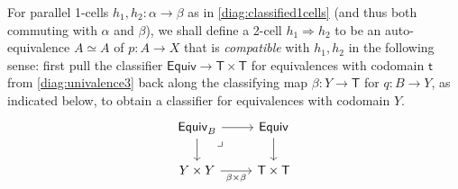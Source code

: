 \documentclass[12pt,reqno]{amsart}
\renewcommand{\to}{\ensuremath{\rightarrow}}
\renewcommand{\t}{\ensuremath{\mathsf{t}}}
\newcommand{\T}{\ensuremath{\mathsf{T}}}
\newcommand{\TT}{\ensuremath{\dot{\mathsf{T}}}}
\newcommand{\pbcorner}{\arrow[dr,phantom,"\lrcorner" very near start, shift right=.5ex]} %
\theoremstyle{remark}
\theoremstyle{definition}
\begin{document}
%
%
For parallel 1-cells $h_1, h_2 : \alpha \to \beta$ as in \eqref{diag:classified1cells} (and thus both commuting with $\alpha$ and $\beta$), we shall define a 2-cell $h_1\Rightarrow h_2$ to be an auto-equivalence $A\simeq A$ of $p :A \to X$ that is \emph{compatible} with $h_1, h_2$ in the following sense: first pull the classifier $\mathsf{Equiv} \to \T\times\T$ for equivalences with codomain $\t$ from \eqref{diag:univalence3} back along the classifying map $\beta : Y\to \T$ for $q : B \to Y$, as indicated below, to obtain a classifier for equivalences with codomain $Y$.
\begin{equation}\label{eq:pulledbackclassifier}
\begin{tikzcd}
	\mathsf{Equiv}_B \ar[d] \ar[r]  \pbcorner & \mathsf{Equiv} \ar[d] \\  
	Y\times Y \ar[r,swap,"{\beta \times \beta}"] &  \T \times \T
 \end{tikzcd}
 \end{equation}
 
\end{document}
